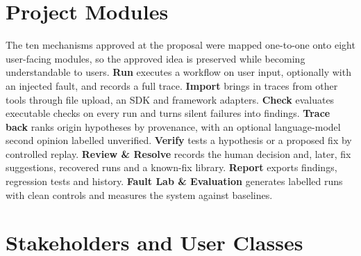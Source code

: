 \documentclass{fast-nuces-bs}
\begin{document}
\section{Project Modules}

The ten mechanisms approved at the proposal were mapped one-to-one onto eight user-facing modules, so the approved idea is preserved while becoming understandable to users. \textbf{Run} executes a workflow on user input, optionally with an injected fault, and records a full trace. \textbf{Import} brings in traces from other tools through file upload, an SDK and framework adapters. \textbf{Check} evaluates executable checks on every run and turns silent failures into findings. \textbf{Trace back} ranks origin hypotheses by provenance, with an optional language-model second opinion labelled unverified. \textbf{Verify} tests a hypothesis or a proposed fix by controlled replay. \textbf{Review \& Resolve} records the human decision and, later, fix suggestions, recovered runs and a known-fix library. \textbf{Report} exports findings, regression tests and history. \textbf{Fault Lab \& Evaluation} generates labelled runs with clean controls and measures the system against baselines.

\section{Stakeholders and User Classes}
\end{document}

